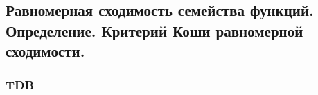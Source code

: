 \subsection{Равномерная сходимость семейства функций. Определение. Критерий Коши равномерной сходимости.}

\subsubsection{TDB}